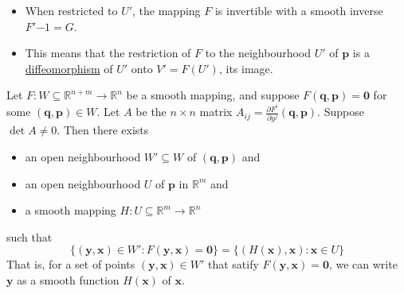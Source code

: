 \documentclass[notoc,notitlepage]{tufte-book}
\begin{document}
\begin{note}
  \begin{itemize}
    \item When restricted to $U'$, the mapping $F$ is invertible with a smooth
      inverse $F'{-1} = G$.
    \item This means that the restriction of $F$ to the neighbourhood $U'$ of
      $\bm{p}$ is a \hyperref[defn:diffeomorphism]{diffeomorphism} of $U'$ onto
      $V' = F(U')$, its image.
  \end{itemize}
\end{note}

\begin{thm}\label{thm:implicit_function_theorem}
  Let $F : W \subseteq \mathbb{R}^{n + m} \to \mathbb{R}^n$ be a smooth mapping,
  and suppose $F(\bm{q}, \bm{p}) = \bm{0}$ for some $(\bm{q}, \bm{p}) \in W$.
  Let $A$ be the $n \times n$ matrix $A_{ij} = \frac{\partial F^i}{\partial y^j}
  (\bm{q}, \bm{p})$. Suppose $\det A \neq 0$. Then there exists
  \begin{itemize}
    \item an open neighbourhood $W' \subseteq W$ of $(\bm{q}, \bm{p})$ and
    \item an open neighbourhood $U$ of $\bm{p}$ in $\mathbb{R}^m$ and
    \item a smooth mapping $H : U \subseteq \mathbb{R}^m \to \mathbb{R}^n$
  \end{itemize}
  such that
  \begin{equation*}
    \{ (\bm{y}, \bm{x}) \in W' : F(\bm{y}, \bm{x}) = \bm{0} \} = \{ (H(\bm{x}),
    \bm{x}) : \bm{x} \in U \}
  \end{equation*}
  That is, for a set of points $(\bm{y}, \bm{x}) \in W'$ that satify $F(\bm{y},
  \bm{x}) = \bm{0}$, we can write $\bm{y}$ as a smooth function $H(\bm{x})$ of
  $\bm{x}$.
\end{thm}



\backmatter

\pagestyle{plain}



\printindex
\end{document}
